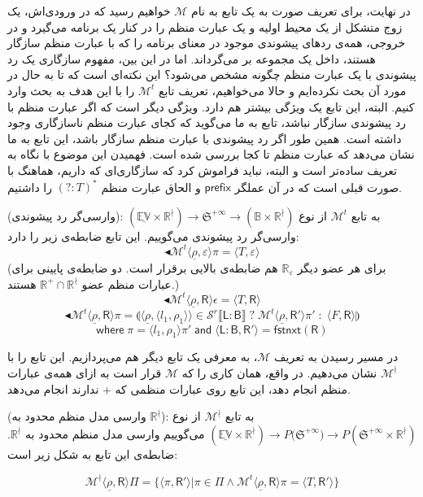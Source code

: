 در نهایت، برای تعریف صورت به یک تابع به نام $\mathcal{M}$ خواهیم رسید که در ورودی‌اش، یک زوج متشکل از یک محیط اولیه و یک عبارت منظم را در کنار یک برنامه می‌گیرد و در خروجی، همه‌ی ردهای پیشوندی موجود در معنای برنامه را که با عبارت منظم سازگار هستند، داخل یک مجموعه بر می‌گرداند.
اما در این بین، مفهوم سازگاری یک رد پیشوندی با یک عبارت منظم چگونه مشخص می‌شود؟ این نکته‌ای است که تا به حال در مورد آن بحث نکرده‌ایم و حالا می‌خواهیم، تعریف تابع $\mathcal{M}^t$ را با این هدف به بحث وارد کنیم. البته، این تابع یک ویژگی بیشتر هم دارد. ویژگی دیگر است که اگر عبارت منظم با رد پیشوندی سازگار نباشد، تابع به ما می‌گوید که کجای عبارت منظم ناسازگاری وجود داشته است. همین ‌طور اگر رد پیشوندی با عبارت منظم سازگار باشد، این تابع به ما نشان می‌دهد که عبارت منظم تا کجا بررسی شده است. فهمیدن این موضوع با نگاه به تعریف ساده‌تر است و البته، نباید فراموش کرد که سازگاری‌ای که داریم، هماهنگ با صورت قبلی است که در آن عملگر 
$\mathsf{prefix}$
و الحاق عبارت منظم
$\mathsf{(?:\mathit{T})^*}$
را داشتیم. 
\begin{defn}
	(وارسی‌گر رد پیشوندی): به تابع $\mathcal{M}^t$ از نوع 
	$\mathbb{(\underline{EV} \times R^\nmid) \rightarrow  \mathfrak{S}^{+\infty}}
	\rightarrow (\mathbb{B \times R^\nmid} ) $
	وارسی‌گر رد پیشوندی می‌گوییم. این تابع ضابطه‌ی زیر را دارد:
	$$\blacktriangleleft\mathcal{M}^t \langle \underline{\rho} , \varepsilon \rangle \pi = 
	\langle \mathit{T} , \varepsilon \rangle$$
	(برای هر عضو دیگر $\mathbb{R_\varepsilon}$ هم ضابطه‌ی بالایی برقرار است. دو ضابطه‌ی پایینی برای عبارات منظم عضو $\mathbb{R^+ \cap R^\nmid}$ هستند.)
	$$\blacktriangleleft\mathcal{M}^t \langle \underline{\rho} , \mathsf{R} \rangle \epsilon = 
	\langle \mathit{T} , \mathsf{R} \rangle$$
	$$\blacktriangleleft\mathcal{M}^t \langle \underline{\rho} , \mathsf{R} \rangle \pi = 
	\llparenthesis \langle \underline{\rho}, \langle l_1, \rho_1 \rangle \rangle \in
	\mathcal{S}^r \llbracket \mathsf{L:B} \rrbracket \; ? \; 
	\mathcal{M}^t \langle \underline{\rho}, \mathsf{R'} \rangle \pi' \; : \; 
	\langle \mathit{F}, \mathsf{R} \rangle \rrparenthesis$$
	$$\mathsf{where}\; \pi=\langle l_1,\rho_1\rangle \pi' \;\mathsf{and}\; 
	\langle \mathsf{L:B,R'}\rangle = \mathsf{fstnxt(R)}$$
	
\end{defn}

در مسیر رسیدن به تعریف $\mathcal{M}$، به معرفی یک تابع دیگر هم می‌پردازیم. این تابع را با
 $\mathcal{M}^\nmid$ 
نشان می‌دهیم. در واقع، همان کاری را که $\mathcal{M}$ قرار است به ازای همه‌ی عبارات منظم انجام دهد، این تابع روی عبارات منظمی که $+$ ندارند انجام می‌دهد.
\begin{defn}
	(وارسی مدل منظم محدود به $\mathbb{R^\nmid}$): به تابع $\mathcal{M}^\nmid$ از نوع \break
	$\mathbb{(\underline{EV} \times R^\nmid)} \rightarrow  \mathit{P}({\mathfrak{S}^{+\infty})}
	\rightarrow \mathit{P}(\mathfrak{S}^{+\infty} \times \mathbb{R}^\nmid ) $
	می‌گوییم وارسی مدل منظم محدود به $\mathbb{R^\nmid}$. ضابطه‌ی این تابع به شکل زیر است:
	
	 $$\mathcal{M}^\nmid \langle \underline{\rho} , \mathsf{R} \rangle \Pi= \{ \langle \pi , \mathsf{R'} \rangle | \pi \in \Pi \land  
	  \mathcal{M}^t \langle \underline{\rho} , \mathsf{R} \rangle \pi =
	 \langle \mathit{T} , \mathsf{R'} \rangle \}$$
\end{defn}


